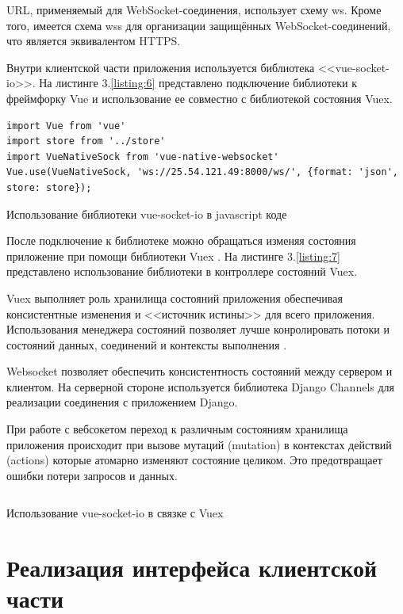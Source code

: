 URL, применяемый для WebSocket-соединения, использует схему ws. Кроме того, имеется схема wss для организации защищённых WebSocket-соединений, что является эквивалентом HTTPS.

Внутри клиентской части приложения используется библиотека <<vue-socket-io>>. На листинге 3.\ref{listing:6} представлено подключение библиотеки к фреймфорку Vue и использование ее совместно с библиотекой состояния Vuex.

\begin{listing}[H]
\begin{verbatim}
import Vue from 'vue'
import store from '../store'
import VueNativeSock from 'vue-native-websocket'
Vue.use(VueNativeSock, 'ws://25.54.121.49:8000/ws/', {format: 'json', store: store});
\end{verbatim}
\caption{Использование библиотеки vue-socket-io в javascript коде}
\label{listing:6}
\end{listing}

После подключение к библиотеке можно обращаться изменяя состояния приложение при помощи библиотеки Vuex \cite{halliday2018vue}. На листинге 3.\ref{listing:7} представлено использование библиотеки в контроллере состояний Vuex. 

Vuex выполняет роль хранилища состояний приложения обеспечивая консистентные изменения и <<источник истины>> для всего приложения. Использования менеджера состояний позволяет лучше конролировать потоки и состояний данных, соединений и контексты выполнения \cite{halliday2018vue}.

Websocket позволяет обеспечить консистентность состояний между сервером и клиентом. На серверной стороне используется библиотека Django Channels для реализации соединения с приложением Django.

При работе с вебсокетом переход к различным состояниям хранилища приложения происходит при вызове мутаций (mutation) в контекстах действий (actions) которые атомарно изменяют состояние целиком. Это предотвращает ошибки потери запросов и данных.  

\begin{listing}[H]
   \inputminted[breaklines, breakanywhere, linenos, fontsize=\small]{javascript}{source/vue-socket.js}
\caption{Использование vue-socket-io в связке с Vuex}
\label{listing:7}
\end{listing}


\section{Реализация интерфейса клиентской части}


